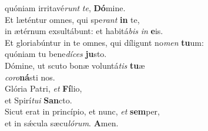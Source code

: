 \evenverse quóniam irritavé\textit{runt} \textit{te}, \textbf{Dó}mine.\\
\oddverse Et læténtur omnes, qui spe\textit{rant} \textbf{in} te,~\*\\
\oddverse in ætérnum exsultábunt: et habitá\textit{bis} \textit{in} \textbf{e}is.\\
\evenverse Et gloriabúntur in te omnes, qui díligunt no\textit{men} \textbf{tu}um:~\*\\
\evenverse quóniam tu bene\textit{dí}\textit{ces} \textbf{ju}sto.\\
\oddverse Dómine, ut scuto bonæ voluntá\textit{tis} \textbf{tu}æ~\*\\
\oddverse \textit{co}\textit{ro}\textbf{ná}sti nos.\\
\evenverse Glória Patri, \textit{et} \textbf{Fí}lio,~\*\\
\evenverse et Spirí\textit{tu}\textit{i} \textbf{San}cto.\\
\oddverse Sicut erat in princípio, et nunc, \textit{et} \textbf{sem}per,~\*\\
\oddverse et in sǽcula sæcu\textit{ló}\textit{rum}. \textbf{A}men.\\
